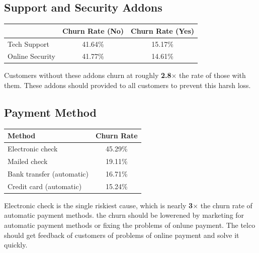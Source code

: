 \documentclass[11pt]{article}
\begin{document}
\subsection*{Support and Security Addons}
\begin{center}
\begin{tabular}{lcc}
\toprule
 & \textbf{Churn Rate (No)} & \textbf{Churn Rate (Yes)} \\
\midrule
Tech Support & 41.64\% & 15.17\% \\
Online Security & 41.77\% & 14.61\% \\
\bottomrule
\end{tabular}
\end{center}
Customers without these addons churn at roughly \textbf{2.8$\times$} the rate of those with them. These addons should provided to all customers to prevent this harsh loss.

\subsection*{Payment Method}
\begin{center}
\begin{tabular}{lc}
\toprule
\textbf{Method} & \textbf{Churn Rate} \\
\midrule
Electronic check & 45.29\% \\
Mailed check & 19.11\% \\
Bank transfer (automatic) & 16.71\% \\
Credit card (automatic) & 15.24\% \\
\bottomrule
\end{tabular}
\end{center}
Electronic check is the single riskiest cause, which is nearly \textbf{3$\times$} the churn rate of automatic payment methods. the churn should be lowerened by marketing for automatic payment methods or fixing the problems of onlune payment. The telco should get feedback of customers of problems of online payment and solve it quickly.
\end{document}
